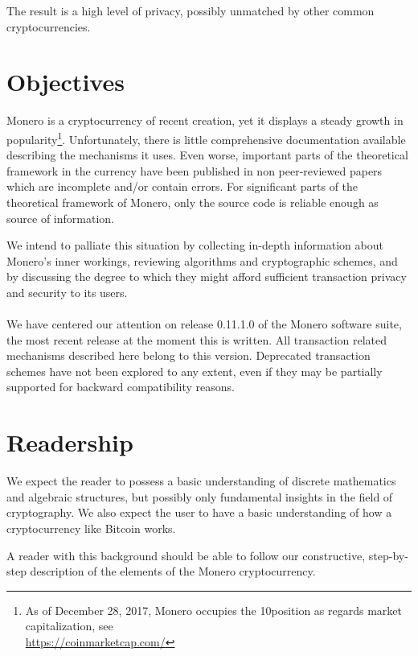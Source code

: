 The result is a high level of privacy, possibly unmatched by other common cryptocurrencies.





\section{Objectives}
\label{sec:goals}

Monero is a cryptocurrency of recent creation, yet it displays a steady growth in popularity\footnote{
As of December 28\nth, 2017, Monero occupies the 10\nth position as regards market capitalization, see\\ \url{https://coinmarketcap.com/}}. 
Unfortunately, there is little comprehensive documentation available describing the mechanisms it uses. 
Even worse, important parts of the theoretical framework in the currency have been published
in non peer-reviewed papers which are incomplete and/or contain errors.
For significant parts of the theoretical framework of Monero, only the source code is reliable enough as source
of information.
  
We intend to palliate this situation by collecting in-depth information about Monero's inner workings, 
reviewing algorithms and cryptographic schemes, and by discussing the degree to which they might afford sufficient 
transaction privacy and security to its users.
\\ 
\\ 

We have centered our attention on release 0.11.1.0 of the Monero software suite,
the most recent release at the moment this is written.
All transaction related mechanisms described here belong to this version. 
Deprecated transaction schemes have not been explored to any extent, even if they may
be partially supported for backward compatibility reasons.


\section{Readership}

We expect the reader to possess a basic understanding of discrete mathematics and algebraic structures, but possibly only
fundamental insights in the field of cryptography.
We also expect the user to have a basic understanding of how a cryptocurrency like Bitcoin works.

A reader with this background should be able to follow our constructive, step-by-step description of the elements of the Monero cryptocurrency.

